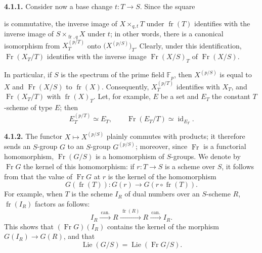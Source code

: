 \medskip
\noindent\textbf{4.1.1.}
\label{sga3:VIIA:4.1.1}
Consider now a base change \(t:T\to S\). Since the square
\begin{center}
\end{center}
is commutative, the inverse image of \(X\times_{q,t}T\) under
\(\operatorname{fr}(T)\) identifies with the inverse image of
\(S\times_{\operatorname{fr},q}X\) under \(t\); in other words, there is
a canonical isomorphism from \(X_T^{(p/T)}\) onto
\(\bigl(X^{(p/S)}\bigr)_T\). Clearly, under this identification,
\(\operatorname{Fr}(X_T/T)\) identifies with the inverse image
\(\operatorname{Fr}(X/S)_T\) of \(\operatorname{Fr}(X/S)\).

In particular, if \(S\) is the spectrum of the prime field
\(\mathbb F_p\), then \(X^{(p/S)}\) is equal to \(X\) and
\(\operatorname{Fr}(X/S)\) to \(\operatorname{fr}(X)\). Consequently,
\(X_T^{(p/T)}\) identifies with \(X_T\), and
\(\operatorname{Fr}(X_T/T)\) with \(\operatorname{fr}(X)_T\). Let, for
example, \(E\) be a set and \(E_T\) the constant \(T\)-scheme of type
\(E\); then
\[
  E_T^{(p/T)}\simeq E_T,
  \qquad
  \operatorname{Fr}(E_T/T)\simeq\operatorname{id}_{E_T}.
\]

\medskip
\noindent\textbf{4.1.2.}
\label{sga3:VIIA:4.1.2}
The functor \(X\mapsto X^{(p/S)}\) plainly commutes with products; it
therefore sends an \(S\)-group \(G\) to an \(S\)-group \(G^{(p/S)}\);
moreover, since \(\operatorname{Fr}\) is a functorial homomorphism,
\(\operatorname{Fr}(G/S)\) is a homomorphism of \(S\)-groups. We denote
by \(\operatorname{Fr}G\) the kernel of this homomorphism: if
\(r:T\to S\) is a scheme over \(S\), it follows from  that the
value of \(\operatorname{Fr}G\) at \(r\) is the kernel of the
homomorphism
\[
  G(\operatorname{fr}(T)):
  G(r)\longrightarrow G(r\circ\operatorname{fr}(T)).
\]
For example, when \(T\) is the scheme \(I_R\) of dual numbers over an
\(S\)-scheme \(R\), \(\operatorname{fr}(I_R)\) factors as follows:
\[
  I_R\xrightarrow{\ \mathrm{can.}\ }R
  \xrightarrow{\ \operatorname{fr}(R)\ }R
  \xrightarrow{\ \mathrm{can.}\ }I_R.
\]
This shows that \((\operatorname{Fr}G)(I_R)\) contains the kernel of the
morphism \(G(I_R)\to G(R)\), and that
\[
  \operatorname{Lie}(G/S)
  =
  \operatorname{Lie}(\operatorname{Fr}G/S).
\]

